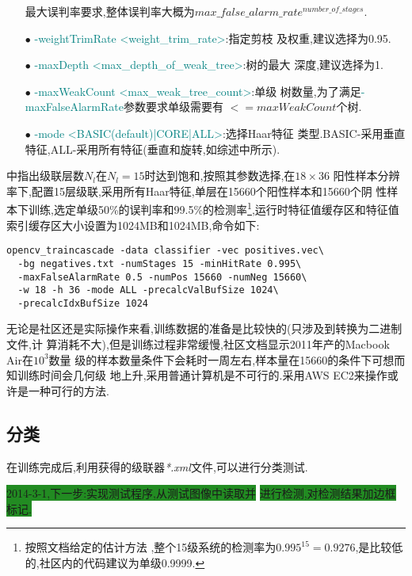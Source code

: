 \documentclass[10pt,technote]{IEEEtran}
\begin{document}
\begin{enumerate}
最大误判率要求,整体误判率大概为$max\_false\_alarm\_rate^{number\_of\_stages}$.
\item[$\bullet$]\textcolor{teal}{-weightTrimRate <weight\_trim\_rate>}:指定剪枝
及权重,建议选择为0.95.
\item[$\bullet$]\textcolor{teal}{-maxDepth <max\_depth\_of\_weak\_tree>}:树的最大
深度,建议选择为1.
\item[$\bullet$]\textcolor{teal}{-maxWeakCount <max\_weak\_tree\_count>}:单级
树数量,为了满足\textcolor{teal}{-maxFalseAlarmRate}参数要求单级需要有
$<=maxWeakCount$个树.
\item[$\bullet$]\textcolor{teal}{-mode <BASIC(default)|CORE|ALL>}:选择Haar特征
类型.BASIC-采用垂直特征,ALL-采用所有特征(垂直和旋转,如综述\cite{bib1}中所示).
\end{enumerate}
\cite{bib1}中指出级联层数$N_l$在$N_l=15$时达到饱和,按照其参数选择,在$18\times36$
阳性样本分辨率下,配置15层级联,采用所有Haar特征,单层在15660个阳性样本和15660个阴
性样本下训练,选定单级50\%的误判率和99.5\%的检测率\footnote{按照文档给定的估计方法
,整个15级系统的检测率为$0.995^{15}=0.9276$,是比较低的,社区内的代码建议为单级0.9999.
},运行时特征值缓存区和特征值索引缓存区大小设置为1024MB和1024MB,命令如下:
\begin{lstlisting}
opencv_traincascade -data classifier -vec positives.vec\
  -bg negatives.txt -numStages 15 -minHitRate 0.995\ 
  -maxFalseAlarmRate 0.5 -numPos 15660 -numNeg 15660\ 
  -w 18 -h 36 -mode ALL -precalcValBufSize 1024\
  -precalcIdxBufSize 1024
\end{lstlisting}
无论是社区还是实际操作来看,训练数据的准备是比较快的(只涉及到转换为二进制文件,计
算消耗不大),但是训练过程非常缓慢,社区文档显示2011年产的Macbook Air在$10^3$数量
级的样本数量条件下会耗时一周左右,样本量在15660的条件下可想而知训练时间会几何级
地上升,采用普通计算机是不可行的.采用AWS EC2来操作或许是一种可行的方法.
\subsection{分类}
在训练完成后,利用获得的级联器\textit{*.xml}文件,可以进行分类测试.
\begin{flushright}
\colorbox{ForestGreen}{2014-3-1,下一步:实现测试程序,从测试图像中读取并}
\colorbox{ForestGreen}{进行检测,对检测结果加边框标记.}
\end{flushright}
\end{document}
